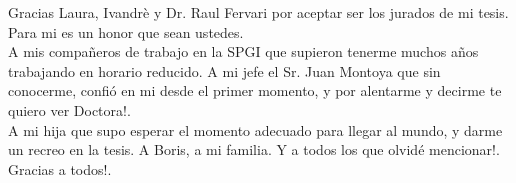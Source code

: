 {Gracias Laura, Ivandr\`e y Dr. Raul Fervari por aceptar ser los jurados de mi tesis. Para mi es un honor que sean ustedes.\\
A mis compa\~neros de trabajo en la SPGI que supieron tenerme muchos a\~nos trabajando en horario reducido. A mi jefe el Sr. Juan Montoya que sin conocerme, confi\'o en mi desde el primer momento, y por alentarme y decirme te quiero ver Doctora!.\\
A mi hija que supo esperar el momento adecuado para llegar al mundo, y darme un recreo en la tesis. A Boris, a mi familia.
Y a todos los que olvid\'e mencionar!. Gracias a todos!.
}

\vspace{\fill}
